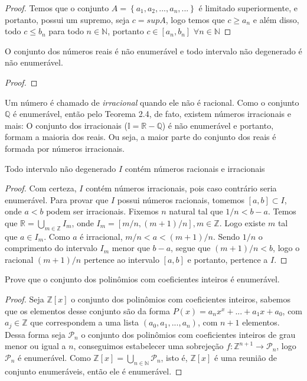 \begin{proof}
Temos que o conjunto $A=\left \{a_{1},a_{2},...,a_{n},...  \right \}$ é limitado superiormente, e portanto, possui um supremo, seja $c=supA$, logo temos que $c \geq a_{n}$ e além disso, todo $c \leq b_{n}$ para todo $n \in \mathbb{N}$, portanto $c \in [a_{n},b_{n}]$ $\forall n \in \mathbb{N}$
\end{proof}

\begin{theorem}
O conjunto dos números reais é não enumerável e todo intervalo não degenerado é não enumerável.
\end{theorem}
\begin{proof}

\end{proof}

Um número é chamado de \textit{irracional} quando ele não é racional. Como o conjunto $\mathbb{Q}$ é enumerável, então pelo Teorema 2.4, de fato, existem números irracionais e mais: O conjunto dos irracionais ($\mathbb{I}=\mathbb{R}-\mathbb{Q}$) é não enumerável e portanto, formam a maioria dos reais. Ou seja, a maior parte do conjunto dos reais é formada por números irracionais.

\begin{theorem}
Todo intervalo não degenerado $I$ contém números racionais e irracionais
\end{theorem}

\begin{proof}
Com certeza, $I$ contém números irracionais, pois caso contrário seria enumerável. Para provar que $I$ possui números racionais, tomemos $[a,b] \subset I$, onde $a<b$ podem ser irracionais. Fixemos $n$ natural tal que $1/n < b-a$. Temos que $\mathbb{R}=\bigcup_{m\in \mathbb{Z}}^{}I_{m}$, onde $I_{m}=[m/n,(m+1)/n],m \in \mathbb{Z}$. Logo existe $m$ tal que $a \in I_{m}$. Como $a$ é irracional, $m/n < a < (m+1)/n$. Sendo $1/n$ o comprimento do intervalo $I_{m}$ menor que $b-a$, segue que $(m+1)/n < b$, logo o racional $(m+1)/n$ pertence ao intervalo $[a,b]$ e portanto, pertence a $I$.
\end{proof}

\begin{prob}
Prove que o conjunto dos polinômios com coeficientes inteiros é enumerável.
\end{prob}

\begin{proof}
Seja $\mathbb{Z}[x]$ o conjunto dos polinômios com coeficientes inteiros, sabemos que os elementos desse conjunto são da forma $P(x)=a_{n}x^{x}+...+a_{1}x+a_{0}$, com $a_{j} \in \mathbb{Z}$ que correspondem a uma lista $(a_{0},a_{1},...,a_{n})$, com $n+1$ elementos. Dessa forma seja $\mathcal{P}_n$ o conjunto dos polinômios com coeficientes inteiros de grau menor ou igual a $n$, conseguimos estabelecer uma sobrejeção $f:\mathbb{Z}^{n+1}\rightarrow \mathcal{P}_n$, logo $\mathcal{P}_n$ é enumerável. Como $\mathbb{Z}[x]=\bigcup_{n \in \mathbb{N}}\mathcal{P}_n$, isto é, $\mathbb{Z}[x]$ é uma reunião de conjunto enumeráveis, então ele é enumerável.
\end{proof}